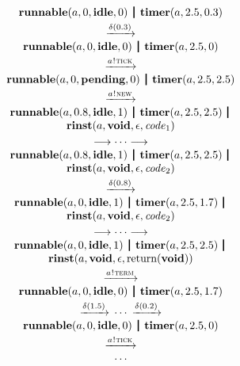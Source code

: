 \documentclass[10pt,conference]{IEEEtran}
\begin{document}
$$
\begin{array}{c}
  {\Trunnable a 0 \Tidle 0} \Opar
  {\Ttimer a {2.5} {0.3}} \vspace{0.6ex} \\
  \red{\Tdelta {0.3}} \\
  {\Trunnable a 0 \Tidle 0} \Opar
  {\Ttimer a {2.5} 0} \vspace{0.6ex} \\
  \red{\say a \Ttick} \\
  {\Trunnable a 0 \Tpending 0} \Opar
  {\Ttimer a {2.5} {2.5}} \vspace{0.6ex} \\
  \red{\say a \Tnew} \\
  {\Trunnable a {0.8} \Tidle 1} \Opar
  {\Ttimer a {2.5} {2.5}} \,\Opar \\
  {\Trinst a \Tvoid \Teps {\Code_1}} \vspace{0.6ex} \\
  \longrightarrow \cdots \longrightarrow \\
  {\Trunnable a {0.8} \Tidle 1} \Opar
  {\Ttimer a {2.5} {2.5}} \,\Opar \\
  {\Trinst a \Tvoid \Teps {\Code_2}} \vspace{0.6ex} \\
  \red{\Tdelta {0.8}} \\
  {\Trunnable a 0 \Tidle 1} \Opar
  {\Ttimer a {2.5} {1.7}} \,\Opar \\
  {\Trinst a \Tvoid \Teps {\Code_2}} \vspace{0.6ex} \\
  \longrightarrow \cdots \longrightarrow \\
  {\Trunnable a 0 \Tidle 1} \Opar
  {\Ttimer a {2.5} {2.5}} \,\Opar \\
  {\Trinst a \Tvoid \Teps {\Treturn \Tvoid}} \vspace{0.6ex} \\
  \red{\say a \Tterm} \\
  {\Trunnable a 0 \Tidle 0} \Opar
  {\Ttimer a {2.5} {1.7}} \vspace{0.6ex} \\
  \red{\Tdelta {1.5}} \cdots \red{\Tdelta {0.2}} \\
  {\Trunnable a 0 \Tidle 0} \Opar
  {\Ttimer a {2.5} 0} \vspace{0.6ex} \\
  \red{\say a \Ttick} \\
  \cdots
\end{array}
$$
\end{document}
